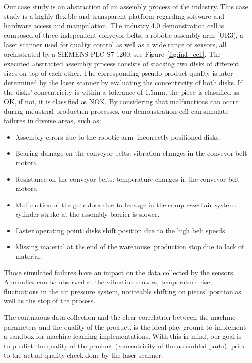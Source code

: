 \documentclass[5p,times,procedia]{elsarticle}
\begin{document}
Our case study is an abstraction of an assembly process of the industry. This case study is a highly flexible and transparent platform regarding software and hardware access and manipulation. The industry 4.0 demonstration cell is composed of three independent conveyor belts, a robotic assembly arm (UR3), a laser scanner used for quality control as well as a wide range of sensors, all orchestrated by a SIEMENS PLC S7-1200, see Figure~\ref{fig:ind_cell}. 
The executed abstracted assembly process consists of stacking two disks of different sizes on top of each other. The corresponding pseudo product quality is later determined by the laser scanner by evaluating the concentricity of both disks. If the disks' concentricity is within a tolerance of 1.5mm, the piece is classified as OK, if not, it is classified as NOK.
By considering that malfunctions can occur during industrial production processes, our demonstration cell can simulate failures in diverse areas, such as:

\begin{itemize}
       \item Assembly errors due to the robotic arm: incorrectly positioned disks.
       \item Bearing damage on the conveyor belts: vibration changes in the conveyor belt motors.
       \item Resistance on the conveyor belts: temperature changes in the conveyor belt motors.
       \item Malfunction of the gate door due to leakage in the compressed air system: cylinder stroke at the assembly barrier is slower.
       \item Faster operating point: disks shift position due to the high belt speeds.
       \item Missing material at the end of the warehouse: production stop due to lack of material.
\end{itemize}

Those simulated failures have an impact on the data collected by the sensors. Anomalies can be observed at the vibration sensors, temperature rise, fluctuations in the air pressure system, noticeable shifting on pieces' position as well as the stop of the process.

The continuous data collection and the clear correlation between the machine parameters and the quality of the product, is the ideal play-ground to implement a sandbox for machine learning implementations. With this in mind, our goal is to predict the quality of the product (concentricity of the assembled parts), prior to the actual quality check done by the laser scanner. 
\end{document}
